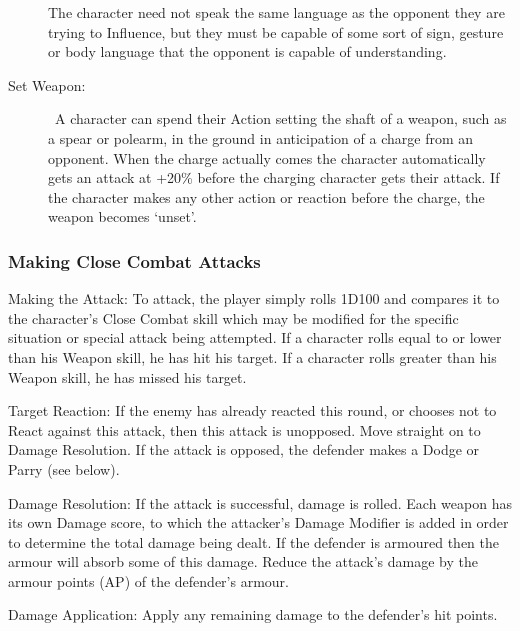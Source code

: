 \begin{description}
The character need not speak the same language as the opponent they are trying to Influence, but they must be capable of some sort of sign, gesture or body language that the opponent is capable of understanding.

	\item[Set Weapon:]  A character can spend their Action setting the shaft of a weapon, such as a spear or polearm, in the ground in anticipation of a charge from an opponent. When the charge actually comes the character automatically gets an attack at +20\% before the charging character gets their attack. If the character makes any other action or reaction before the charge, the weapon becomes ‘unset’.
\end{description}


\subsubsection{Making Close Combat Attacks}
\begin{rpg-list}
\item Making the Attack: To attack, the player simply rolls 1D100 and compares it to the character’s Close Combat skill which may be modified for the specific situation or special attack being attempted. If a character rolls equal to or lower than his Weapon skill, he has hit his target. If a character rolls greater than his Weapon skill, he has missed his target. 

\item Target Reaction: If the enemy has already reacted this round, or chooses not to React against this attack, then this attack is unopposed. Move straight on to Damage Resolution. If the attack is opposed, the defender makes a Dodge or Parry (see below).

\item Damage Resolution: If the attack is successful, damage is rolled. Each weapon has its own Damage score, to which the attacker’s Damage Modifier is added in order to determine the total damage being dealt. If the defender is armoured then the armour will absorb some of this damage. Reduce the attack’s damage by the armour points (AP) of the defender’s armour. 

\item Damage Application: Apply any remaining damage to the defender’s hit points. 
\end{rpg-list}


